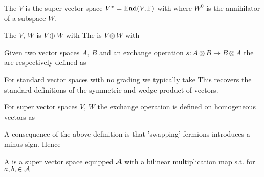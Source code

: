 \documentclass{article}
\begin{document}
\begin{definition}
	The  $V$ is the super vector space $V^\ast = \operatorname{End}(V,\mathbb{F})$ with 
where $W^0$ is the annihilator of a subspace $W$. 
\end{definition}

\begin{definition}
	The  $V, \, W$ is $V \oplus W$ with
The  is $V \otimes W$ with 
\end{definition}

\begin{definition}
	Given two vector spaces $A, \, B$ and an exchange operation $s : A \otimes B \to B \otimes A$ the  are respectively defined as 
\end{definition}

\begin{example}
	For standard vector spaces with no grading we typically take 
This recovers the standard definitions of the symmetric and wedge product of vectors. 
\end{example}

\begin{definition}
	For super vector spaces $V, \, W$ the exchange operation is defined on homogeneous vectors as 
\end{definition}

\begin{remark}
	A consequence of the above definition is that 'swapping' fermions introduces a minus sign. Hence 
\end{remark}

\begin{definition}
	A  is a super vector space equipped $\mathcal{A}$ with a bilinear multiplication map s.t. for $a,b, \in \mathcal{A}$
\end{definition}
\end{document}

